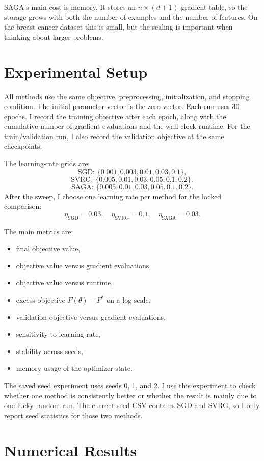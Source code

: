 \documentclass{article}
\begin{document}
SAGA's main cost is memory. It stores an $n \times (d+1)$ gradient table, so the
storage grows with both the number of examples and the number of features. On
the breast cancer dataset this is small, but the scaling is important when
thinking about larger problems.

\section{Experimental Setup}

All methods use the same objective, preprocessing, initialization, and stopping
condition. The initial parameter vector is the zero vector. Each run uses 30
epochs. I record the training objective after each epoch, along with the
cumulative number of gradient evaluations and the wall-clock runtime. For the
train/validation run, I also record the validation objective at the same
checkpoints.

The learning-rate grids are:
\[
\text{SGD: } \{0.001, 0.003, 0.01, 0.03, 0.1\},
\]
\[
\text{SVRG: } \{0.005, 0.01, 0.03, 0.05, 0.1, 0.2\},
\]
\[
\text{SAGA: } \{0.005, 0.01, 0.03, 0.05, 0.1, 0.2\}.
\]
After the sweep, I choose one learning rate per method for the locked
comparison:
\[
\eta_{\text{SGD}} = 0.03, \quad
\eta_{\text{SVRG}} = 0.1, \quad
\eta_{\text{SAGA}} = 0.03.
\]

The main metrics are:
\begin{itemize}
    \item final objective value,
    \item objective value versus gradient evaluations,
    \item objective value versus runtime,
    \item excess objective $F(\theta)-F^*$ on a log scale,
    \item validation objective versus gradient evaluations,
    \item sensitivity to learning rate,
    \item stability across seeds,
    \item memory usage of the optimizer state.
\end{itemize}

The saved seed experiment uses seeds 0, 1, and 2. I use this experiment to
check whether one method is consistently better or whether the result is mainly
due to one lucky random run. The current seed CSV contains SGD and SVRG, so I
only report seed statistics for those two methods.

\section{Numerical Results}
\end{document}
